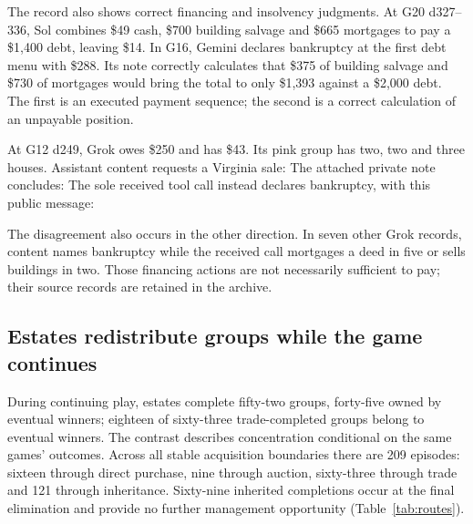 The record also shows correct financing and insolvency judgments. At G20 d327--336, Sol combines \$49 cash, \$700 building salvage and \$665 mortgages to pay a \$1,400 debt, leaving \$14. In G16, Gemini declares bankruptcy at the first debt menu with \$288. Its note correctly calculates that \$375 of building salvage and \$730 of mortgages would bring the total to only \$1,393 against a \$2,000 debt. The first is an executed payment sequence; the second is a correct calculation of an unpayable position.


At G12 d249, Grok owes \$250 and has \$43. Its pink group has two, two and three houses. Assistant content requests a Virginia sale:
The attached private note concludes:
The sole received tool call instead declares bankruptcy, with this public message:

The disagreement also occurs in the other direction. In seven other Grok records, content names bankruptcy while the received call mortgages a deed in five or sells buildings in two. Those financing actions are not necessarily sufficient to pay; their source records are retained in the archive.

\subsection{Estates redistribute groups while the game continues}

During continuing play, estates complete fifty-two groups, forty-five owned by eventual winners; eighteen of sixty-three trade-completed groups belong to eventual winners. The contrast describes concentration conditional on the same games' outcomes. Across all stable acquisition boundaries there are 209 episodes: sixteen through direct purchase, nine through auction, sixty-three through trade and 121 through inheritance. Sixty-nine inherited completions occur at the final elimination and provide no further management opportunity (Table~\ref{tab:routes}).

